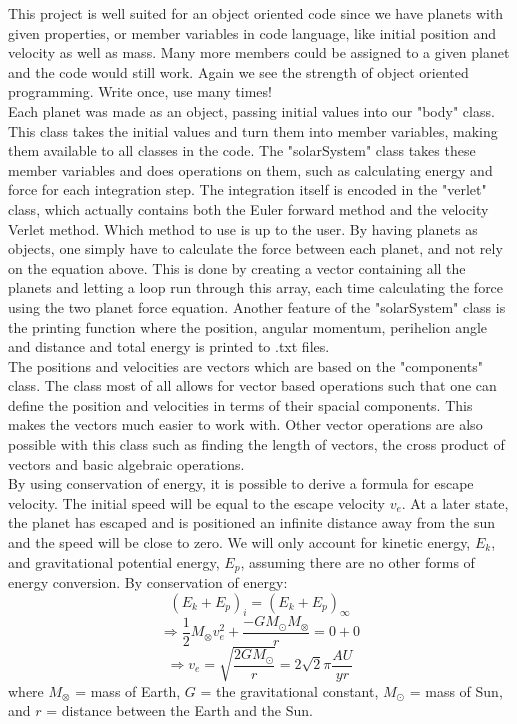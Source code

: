 \documentclass[10pt,a4paper]{article}
\begin{document}
\noindent This project is well suited for an object oriented code since we have planets with given properties, or member variables in code language, like initial position and velocity as well as mass. Many more members could be assigned to a given planet and the code would still work. Again we see the strength of object oriented programming. Write once, use many times! \\


\noindent Each planet was made as an object, passing initial values into our "body" class. This class takes the initial values and turn them into member variables, making them available to all classes in the code. The "solarSystem" class takes these member variables and does operations on them, such as calculating energy and force for each integration step. The integration itself is encoded in the "verlet" class, which actually contains both the Euler forward method and the velocity Verlet method. Which method to use is up to the user. By having planets as objects, one simply have to calculate the force between each planet, and not rely on the equation above. This is done by creating a vector containing all the planets and letting a loop run through this array, each time calculating the force using the two planet force equation. Another feature of the "solarSystem" class is the printing function where the position, angular momentum, perihelion angle and distance and total energy is printed to .txt files.\\


\noindent The positions and velocities are vectors which are based on the "components" class. The class most of all allows for vector based operations such that one can define the position and velocities in terms of their spacial components. This makes the vectors much easier to work with. Other vector operations are also possible with this class such as finding the length of vectors, the cross product of vectors and basic algebraic operations.\\

\noindent By using conservation of energy, it is possible to derive a formula for escape velocity. The initial speed will be equal to the escape velocity $v_e$. At a later state, the planet has escaped and is positioned an infinite distance away from the sun and the speed will be close to zero. We will only account for kinetic energy, $E_k$, and gravitational potential energy, $E_p$, assuming there are no other forms of energy conversion. By conservation of energy: 
$$(E_k+E_p)_i = (E_k+E_p)_{\infty}$$
$$\Rightarrow \frac{1}{2}M_{\otimes}v_e^2 + \frac{-GM_{\odot}M_{\otimes}}{r} = 0 + 0$$
$$\Rightarrow v_e = \sqrt{\frac{2GM_{\odot}}{r}} = 2\sqrt{2}\pi \frac{AU}{yr}$$
where $M_{\otimes}$ = mass of Earth, $G$ = the gravitational constant, $M_{\odot}$ = mass of Sun, and $r$ = distance between the Earth and the Sun.\\
\end{document}
